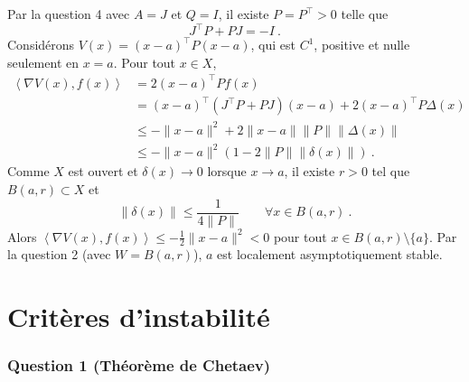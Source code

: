 Par la question 4 avec \(A=J\) et \(Q=I\), il existe \(P=P^\top>0\) telle
que \[
J^\top P +P J = -I \ .
\] Considérons \(V(x) = (x-a)^\top P (x-a)\), qui est \(C^1\), positive
et nulle seulement en \(x=a\). Pour tout \(x\in X\), \begin{align*}
\left< \nabla V(x), f(x) \right> & = 2(x-a)^\top P f(x) \\
&= (x-a)^\top\left( J^\top P +P J\right) (x-a) + 2 (x-a)^\top P\Delta(x) \\
&\leq - \|x-a\|^2 + 2 \|x-a\| \|P\| \|\Delta(x)\| \\
&\leq - \|x-a\|^2\left(1- 2\|P\|  \|\delta(x) \| \right) \ .
\end{align*} Comme \(X\) est ouvert et \(\delta(x)\to 0\) lorsque
\(x\to a\), il existe \(r>0\) tel que \(B(a,r)\subset X\) et \[
\|\delta(x) \| \leq  \frac{1}{4\|P\|}  \qquad \forall x\in B(a,r) \ .
\] Alors \(\left< \nabla V(x), f(x) \right> \leq -\frac{1}{2}\|x-a\|^2 <0\)
pour tout \(x\in B(a,r)\setminus\{a\}\). Par la question 2 (avec
\(W=B(a,r)\)), \(a\) est localement asymptotiquement stable.

\hypertarget{correc_instab}{%
\section{Critères d'instabilité}\label{correc_instab}}

\hypertarget{answer-instab-1}{%
\subsubsection*{Question 1 (Théorème de Chetaev)}\label{answer-instab-1}}


